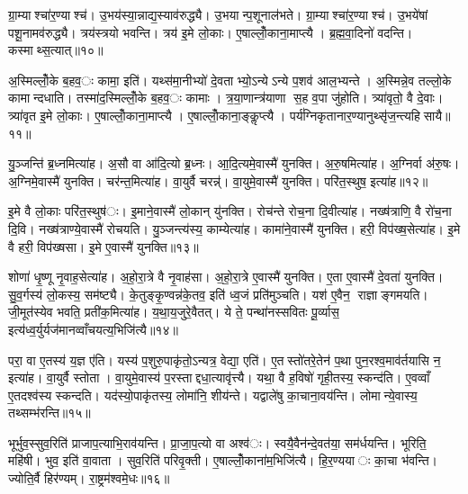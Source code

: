 ग्रा॒म्याश्चा॑र॒ण्याश्च॑। उ॒भय॑स्या॒न्नाद्य॒स्याव॑रुद्ध्यै। उ॒भयान्प॒शूनाल॑भते। ग्रा॒म्याश्चा॑र॒ण्याश्च॑। उ॒भये॑षां पशू॒नामव॑रुद्ध्यै। त्रय॑स्त्रयो भवन्ति। त्रय॑ इ॒मे लो॒काः। ए॒षाल्लोँ॒काना॒माप्त्यै। ब्र॒ह्म॒वा॒दिनो॑ वदन्ति। कस्माथ्स॒त्यात्॥१०॥

अ॒स्मिल्लोँ॒के ब॒हव॒ः कामा॒ इति॑। यथ्स॑मा॒नीभ्यो॑ दे॒वताभ्यो॒ऽन्येऽन्ये प॒शव॑ आल॒भ्यन्ते। अ॒स्मिन्ने॒व तल्लो॒के कामान्दधाति। तस्मा॑द॒स्मिल्लोँ॒के ब॒हव॒ः कामाः। त्र॒या॒णान्त्र॑याणा स॒ह व॒पा जु॑होति। त्र्या॑वृतो॒ वै दे॒वाः। त्र्या॑वृत इ॒मे लो॒काः। ए॒षाल्लोँ॒काना॒माप्त्यै। ए॒षाल्लोँ॒काना॒ङ्कॢप्त्यै। पर्य॑ग्निकृतानार॒ण्यानुथ्सृ॑ज॒न्त्यहिसायै॥११॥


यु॒ञ्जन्ति॑ ब्र॒ध्नमित्या॑ह। अ॒सौ वा आ॑दि॒त्यो ब्र॒ध्नः। आ॒दि॒त्यमे॒वास्मै॑ युनक्ति। अ॒रु॒षमित्या॑ह। अ॒ग्निर्वा अ॑रु॒षः। अ॒ग्निमे॒वास्मै॑ युनक्ति। चर॑न्त॒मित्या॑ह। वा॒युर्वै चरन्न्॑। वा॒युमे॒वास्मै॑ युनक्ति। परि॑त॒स्थुष॒ इत्या॑ह॥१२॥

इ॒मे वै लो॒काः परि॑त॒स्थुष॑ः। इ॒माने॒वास्मै॑ लो॒कान् यु॑नक्ति। रोच॑न्ते रोच॒ना दि॒वीत्या॑ह। नख्ष॑त्राणि॒ वै रो॑च॒ना दि॒वि। नख्ष॑त्राण्ये॒वास्मै॑ रोचयति। यु॒ञ्जन्त्य॑स्य॒ काम्येत्या॑ह। कामा॑ने॒वास्मै॑ युनक्ति। हरी॒ विप॑ख्ष॒सेत्या॑ह। इ॒मे वै हरी॒ विप॑ख्षसा। इ॒मे ए॒वास्मै॑ युनक्ति॥१३॥

शोणा॑ धृ॒ष्णू नृ॒वाह॒सेत्या॑ह। अ॒हो॒रा॒त्रे वै नृ॒वाह॑सा। अ॒हो॒रा॒त्रे ए॒वास्मै॑ युनक्ति। ए॒ता ए॒वास्मै॑ दे॒वता॑ युनक्ति। सु॒व॒र्गस्य॑ लो॒कस्य॒ सम॑ष्ट्यै। के॒तुङ्कृ॒ण्वन्न॑के॒तव॒ इति॑ ध्व॒जं प्रति॑मुञ्चति। यश॑ ए॒वैन॒ राज्ञाङ्गमयति। जी॒मूत॑स्येव भवति॒ प्रती॑क॒मित्या॑ह। य॒था॒य॒जुरे॒वैतत्। ये ते॒ पन्था॑नस्सवितः पू॒र्व्यास॒ इत्य॑ध्व॒र्युर्यज॑मानव्वाँचयत्य॒भिजि॑त्यै॥१४॥

परा॒ वा ए॒तस्य॑ य॒ज्ञ ए॑ति। यस्य॑ प॒शुरु॒पाकृ॑तो॒ऽन्यत्र॒ वेद्या॒ एति॑। ए॒तस्तो॑तरे॒तेन॑ प॒था पुन॒रश्व॒माव॑र्तयासि न॒ इत्या॑ह। वा॒युर्वै स्तोता। वा॒युमे॒वास्य॑ प॒रस्ताद्दधा॒त्यावृ॑त्त्यै। यथा॒ वै ह॒विषो॑ गृही॒तस्य॒ स्कन्द॑ति। ए॒वव्वाँ ए॒तदश्व॑स्य स्कन्दति। यद॑स्यो॒पाकृ॑तस्य॒ लोमा॑नि॒ शीय॑न्ते। यद्वाले॑षु का॒चाना॒वय॑न्ति। लोमान्ये॒वास्य॒ तथ्सम्भ॑रन्ति॥१५॥

भूर्भुव॒स्सुव॒रिति॑ प्राजाप॒त्याभि॒राव॑यन्ति। प्रा॒जा॒प॒त्यो वा अश्व॑ः। स्वयै॒वैन॑न्दे॒वत॑या॒ सम॑र्धयन्ति। भूरिति॒ महि॑षी। भुव॒ इति॑ वा॒वाता। सुव॒रिति॑ परिवृ॒क्ती। ए॒षाल्लोँ॒काना॑म॒भिजि॑त्यै। हि॒र॒ण्ययाः का॒चा भ॑वन्ति। ज्योति॒र्वै हिर॑ण्यम्। रा॒ष्ट्रम॑श्वमे॒धः॥१६॥

